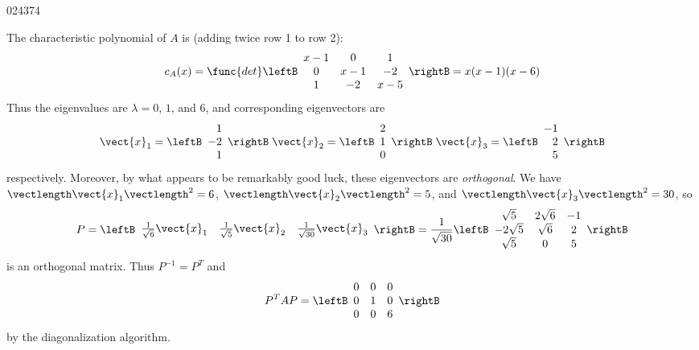 \begin{example}{}{024374}
\begin{solution}
 The characteristic polynomial of $A$ is (adding twice row 1 to row 2):
\begin{equation*}
c_{A}(x) = \func{det}\leftB \begin{array}{ccc}
x - 1 & 0 & 1 \\
0 & x - 1 & -2 \\
1 & -2 & x - 5 
\end{array}\rightB = x(x - 1)(x - 6)
\end{equation*}
Thus the eigenvalues are $\lambda = 0$, $1$, and $6$, and corresponding eigenvectors are
\begin{equation*}
\vect{x}_{1} = \leftB \begin{array}{r}
1 \\
-2 \\
1
\end{array}\rightB \;
\vect{x}_{2} = \leftB \begin{array}{r}
2 \\
1 \\
0
\end{array}\rightB \;
\vect{x}_{3} = \leftB \begin{array}{r}
-1 \\
2 \\
5
\end{array}\rightB
\end{equation*}
respectively. Moreover, by what appears to be remarkably good luck, these eigenvectors are \textit{orthogonal}. We have $\vectlength\vect{x}_{1}\vectlength^{2} = 6$, $\vectlength\vect{x}_{2}\vectlength^{2} = 5$, and $\vectlength\vect{x}_{3}\vectlength^{2} = 30$, so
\begin{equation*}
P = \leftB \begin{array}{ccc}
\frac{1}{\sqrt{6}}\vect{x}_{1} & \frac{1}{\sqrt{5}}\vect{x}_{2} & \frac{1}{\sqrt{30}}\vect{x}_{3}
\end{array}\rightB = \frac{1}{\sqrt{30}} \leftB \begin{array}{ccc}
\sqrt{5} & 2\sqrt{6} & -1 \\
-2\sqrt{5} & \sqrt{6} & 2 \\
\sqrt{5} & 0 & 5 
\end{array}\rightB
\end{equation*}
is an orthogonal matrix. Thus $P^{-1} = P^{T}$ and
\begin{equation*}
P^TAP = \leftB \begin{array}{ccc}
0 & 0 & 0 \\
0 & 1 & 0 \\
0 & 0 & 6
\end{array}\rightB
\end{equation*}
by the diagonalization algorithm.
\end{solution}
\end{example}

